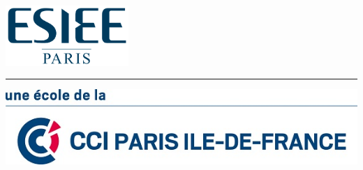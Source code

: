 \begin{titlepage}
  \noindent
  \begin{minipage}{0.35\linewidth}
    \includegraphics[height=65pt]{images/logoESIEE}
  \end{minipage}
  \hfill
  \begin{minipage}[c][65pt][t]{0.35\linewidth}
    \hspace{\fill}
    \reportdate
  \end{minipage}
  \vfill

  \begin{center}
    \large
    {
      \textbf{\textsc{\reporttitle}}
      \bigskip
	
      \textit{\reportsubtitle}
      \bigskip
      \bigskip
    }
  \end{center}

  \vfill

  \begin{flushright}
    \begin{large}
      \textbf{\authorgroup}
      \hspace{2pt}
	
      \rule{0.5\linewidth}{1pt}

	  \ifdefempty{\reportauthora}{}{
	    
	    \medskip
        \reportauthora
	  }
	  \ifdefempty{\reportauthorb}{}{
	    
	    \medskip
        \reportauthorb
	  }
	  \ifdefempty{\reportauthorc}{}{
	    
	    \medskip
        \reportauthorc
	  }
	  \ifdefempty{\reportauthord}{}{
	    
	    \medskip
        \reportauthord
	  }
	  
	\end{large}
  \end{flushright}

  \bigskip

  \vfill\vfill
	
  \hfill
  \includegraphics[scale=1.45]{images/logoCCIP}
	
  \setcounter{page}{0}

  \thispagestyle{empty}
	
  \pagebreak
	
  \pagestyle{toc-style}
  \tableofcontents
  \label{Sommaire}

\end{titlepage}
